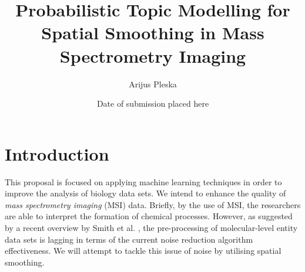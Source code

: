 \documentclass{mprop}
\begin{document}
\title{Probabilistic Topic Modelling for Spatial Smoothing in Mass Spectrometry Imaging}
\author{Arijus Pleska}
\date{Date of submission placed here}
\maketitle

\tableofcontents
\newpage


\section{Introduction}






\par This proposal is focused on applying machine learning techniques in order to improve the analysis of biology data sets. We intend to enhance the quality of \textit{mass spectrometry imaging} (MSI) data. Briefly, by the use of MSI, the researchers are able to interpret the formation of chemical processes. However, as suggested by a recent overview by Smith et al. \cite{smith_2004}, the pre-processing of molecular-level entity data sets is lagging in terms of the current noise reduction algorithm effectiveness. We will attempt to tackle this issue of noise by utilising spatial smoothing. 
  

\end{document}
